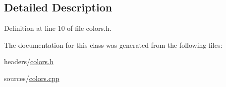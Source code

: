 \subsection{Detailed Description}


Definition at line 10 of file colors.\+h.



The documentation for this class was generated from the following files\+:\begin{DoxyCompactItemize}
\item 
headers/\hyperlink{colors_8h}{colors.\+h}\item 
sources/\hyperlink{colors_8cpp}{colors.\+cpp}\end{DoxyCompactItemize}
